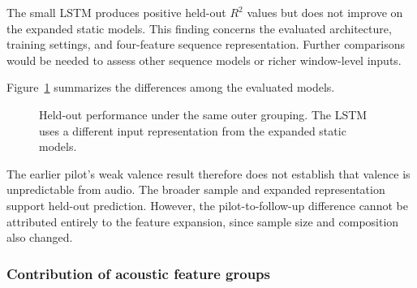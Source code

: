 The small LSTM produces positive held-out $R^2$ values but does not improve on the expanded static models. This finding concerns the evaluated architecture, training settings, and four-feature sequence representation. Further comparisons would be needed to assess other sequence models or richer window-level inputs.

Figure~\ref{fig:performance} summarizes the differences among the evaluated models.

\begin{figure}[ht]
\centering
{}
\caption{Held-out performance under the same outer grouping. The LSTM uses a different input representation from the expanded static models.}
\label{fig:performance}
\end{figure}

The earlier pilot's weak valence result therefore does not establish that valence is unpredictable from audio. The broader sample and expanded representation support held-out prediction. However, the pilot-to-follow-up difference cannot be attributed entirely to the feature expansion, since sample size and composition also changed.

\subsubsection{Contribution of acoustic feature groups}

